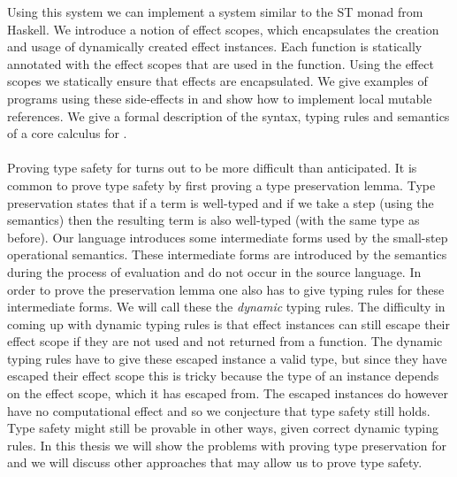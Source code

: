 Using this system we can implement a system similar to the ST monad from Haskell.
We introduce a notion of effect scopes, which encapsulates the creation and usage of dynamically created effect instances.
Each function is statically annotated with the effect scopes that are used in the function.
Using the effect scopes we statically ensure that effects are encapsulated.
We give examples of programs using these side-effects in \lang{} and show how to implement local mutable references.
We give a formal description of the syntax, typing rules and semantics of a core calculus for \lang{}.
\\\\
Proving type safety for \lang{} turns out to be more difficult than anticipated.
It is common to prove type safety by first proving a type preservation lemma.
Type preservation states that if a term is well-typed and if we take a step (using the semantics) then the resulting term is also well-typed (with the same type as before).
Our language introduces some intermediate forms used by the small-step operational semantics.
These intermediate forms are introduced by the semantics during the process of evaluation and do not occur in the source language.
In order to prove the preservation lemma one also has to give typing rules for these intermediate forms.
We will call these the \emph{dynamic} typing rules.
The difficulty in coming up with dynamic typing rules is that effect instances can still escape their effect scope if they are not used and not returned from a function.
The dynamic typing rules have to give these escaped instance a valid type, but since they have escaped their effect scope this is tricky because the type of an instance depends on the effect scope, which it has escaped from.
The escaped instances do however have no computational effect and so we conjecture that type safety still holds.
Type safety might still be provable in other ways, given correct dynamic typing rules.
In this thesis we will show the problems with proving type preservation for \lang{} and we will discuss other approaches that may allow us to prove type safety.


